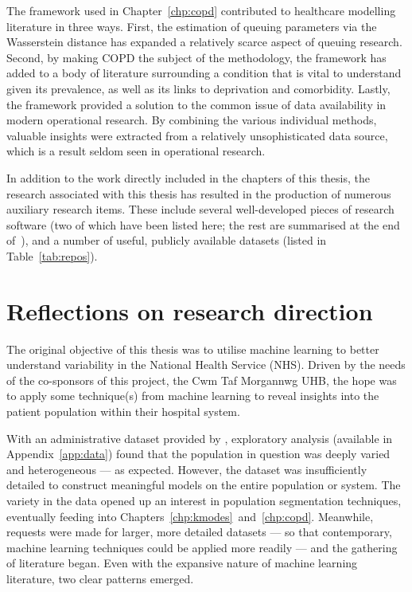 The framework used in Chapter~\ref{chp:copd} contributed to healthcare modelling
literature in three ways. First, the estimation of queuing parameters via the
Wasserstein distance has expanded a relatively scarce aspect of queuing
research. Second, by making COPD the subject of the methodology, the framework
has added to a body of literature surrounding a condition that is vital to
understand given its prevalence, as well as its links to deprivation and
comorbidity. Lastly, the framework provided a solution to the common issue of
data availability in modern operational research. By combining the various
individual methods, valuable insights were extracted from a relatively
unsophisticated data source, which is a result seldom seen in operational
research.

In addition to the work directly included in the chapters of this thesis, the
research associated with this thesis has resulted in the production of numerous
auxiliary research items. These include several well-developed pieces of
research software (two of which have been listed here; the rest are summarised
at the end of~), and a number of useful, publicly
available datasets (listed in Table~\ref{tab:repos}).


\section{Reflections on research direction}\label{sec:reflections}

The original objective of this thesis was to utilise machine learning to
better understand variability in the National Health Service (NHS). Driven by
the needs of the co-sponsors of this project, the Cwm Taf Morgannwg UHB, the
hope was to apply some technique(s) from machine learning to reveal insights
into the patient population within their hospital system.

With an administrative dataset provided by \ctmuhb, exploratory analysis
(available in Appendix~\ref{app:data}) found that the population in question was
deeply varied and heterogeneous --- as expected. However, the dataset was
insufficiently detailed to construct meaningful models on the entire population
or system. The variety in the data opened up an interest in population
segmentation techniques, eventually feeding into
Chapters~\ref{chp:kmodes}~and~\ref{chp:copd}. Meanwhile, requests were made for
larger, more detailed datasets --- so that contemporary, machine learning
techniques could be applied more readily --- and the gathering of literature
began. Even with the expansive nature of machine learning literature, two clear
patterns emerged.

